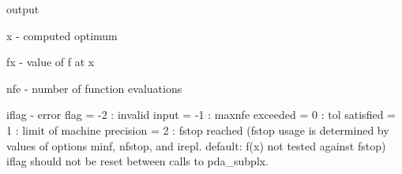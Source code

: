 \documentclass[11pt,twoside,nolof]{starlink}
\begin{document}
\begin{terminalv}
 output

   x      - computed optimum

   fx     - value of f at x

   nfe    - number of function evaluations

   iflag  - error flag
            = -2 : invalid input
            = -1 : maxnfe exceeded
            =  0 : tol satisfied
            =  1 : limit of machine precision
            =  2 : fstop reached (fstop usage is determined
                   by values of options minf, nfstop, and
                   irepl. default: f(x) not tested against
                   fstop)
            iflag should not be reset between calls to
            pda_subplx.
\end{terminalv}




\end{document}
